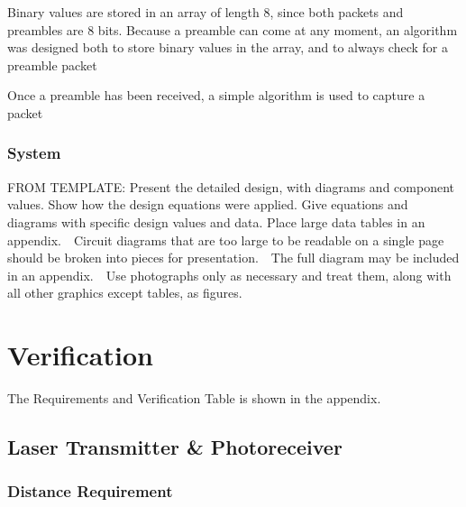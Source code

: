 \documentclass[letterpaper,10pt]{article}
\begin{document}
\begin{spacing}{1.15}
\makeatletter
\def\BState{\State\hskip-\ALG@thistlm}
\makeatother


Binary values are stored in an array of length 8, since both packets and preambles are 8 bits. Because a preamble can come at any moment, an algorithm was designed both to store binary values in the array, and to always check for a preamble packet 



Once a preamble has been received, a simple algorithm is used to capture a packet

\subsubsection{System}

FROM TEMPLATE: Present the detailed design, with diagrams and component values. Show how the design equations were applied. Give equations and diagrams with specific design values and data. Place large data tables in an appendix.  Circuit diagrams that are too large to be readable on a single page should be broken into pieces for presentation.  The full diagram may be included in an appendix.  Use photographs only as necessary and treat them, along with all other graphics except tables, as figures.


\section{Verification}

The Requirements and Verification Table is shown in the appendix.


\subsection{Laser Transmitter \& Photoreceiver}
\subsubsection{Distance Requirement}

\end{spacing}
\end{document}
